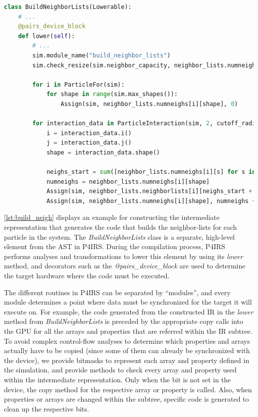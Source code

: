 \documentclass[preprint,12pt]{elsarticle}
\begin{document}
\begin{lstlisting}[language=Python,
                   label={lst:build_neigh},
                   caption={Neighbor-lists intermediate representation construction in P4IRS.}]
class BuildNeighborLists(Lowerable):
    # ...
    @pairs_device_block
    def lower(self):
        # ...
        sim.module_name("build_neighbor_lists")
        sim.check_resize(sim.neighbor_capacity, neighbor_lists.numneighs)

        for i in ParticleFor(sim):
            for shape in range(sim.max_shapes()):
                Assign(sim, neighbor_lists.numneighs[i][shape], 0)

        for interaction_data in ParticleInteraction(sim, 2, cutoff_radius, use_cell_lists=True):
            i = interaction_data.i()
            j = interaction_data.j()
            shape = interaction_data.shape()

            neighs_start = sum([neighbor_lists.numneighs[i][s] for s in range(shape)], 0)
            numneighs = neighbor_lists.numneighs[i][shape]
            Assign(sim, neighbor_lists.neighborlists[i][neighs_start + numneighs], j)
            Assign(sim, neighbor_lists.numneighs[i][shape], numneighs + 1)
\end{lstlisting}

\autoref{lst:build_neigh} displays an example for constructing the intermediate representation that generates the code that builds the neighbor-lists for each particle in the system.
The \emph{BuildNeighborLists} class is a separate, high-level element from the AST in P4IRS.
During the compilation process, P4IRS performs analyses and transformations to lower this element by using its \emph{lower} method, and decorators such as the \emph{@pairs\_device\_block} are used to determine the target hardware where the code must be executed.

The different routines in P4IRS can be separated by ``modules'', and every module determines a point where data must be synchronized for the target it will execute on.
For example, the code generated from the constructed IR in the \emph{lower} method from \emph{BuildNeighborLists} is preceded by the appropriate copy calls into the GPU for all the arrays and properties that are referred within the IR subtree.
To avoid complex control-flow analyses to determine which properties and arrays actually have to be copied (since some of them can already be synchronized with the device), we provide bitmasks to represent each array and property defined in the simulation, and provide methods to check every array and property used within the intermediate representation.
Only when the bit is not set in the device, the copy method for the respective array or property is called.
Also, when properties or arrays are changed within the subtree, specific code is generated to clean up the respective bits.
\end{document}
